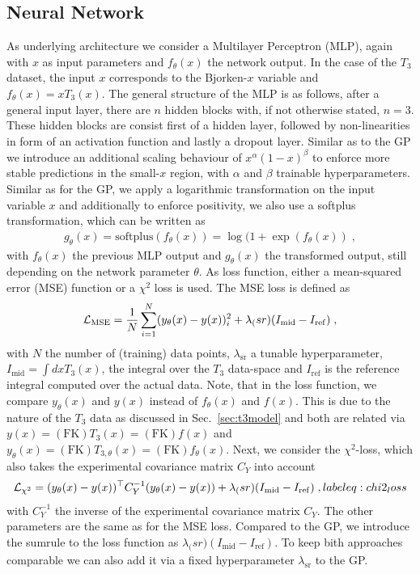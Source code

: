 \documentclass[11pt,a4paper]{article}
\begin{document}
\subsection{Neural Network}
\label{sec:NN}
%
As underlying architecture we consider a Multilayer Perceptron (MLP), again with $x$ as input parameters and $f_\theta(x)$ the network output. In the case of the $T_3$ dataset, the input $x$ corresponds to the Bjorken-$x$ variable and $f_\theta(x)=xT_3(x)$. The general structure of the MLP is as follows, after a general input layer, there are $n$ hidden blocks with, if not otherwise stated, $n=3$. These hidden blocks are consist first of a hidden layer, followed by non-linearities in form of an activation function and lastly a dropout layer.
Similar as to the GP we introduce an additional scaling behaviour of $x^\alpha (1-x)^\beta$ to enforce more stable predictions in the small-$x$ region, with $\alpha$ and $\beta$ trainable hyperparameters. Similar as for the GP, we apply a logarithmic transformation on the input variable $x$ and additionally to enforce positivity, we also use a softplus transformation, which can be written as
%
\begin{align}
    g_\theta(x) = \mathrm{softplus}(f_\theta(x)) = \log(1+\exp(f_\theta(x)) \; ,
    \label{eq:softplus}
\end{align}
%
with $f_\theta(x)$ the previous MLP output and $g_\theta(x)$ the transformed output, still depending on the network parameter $\theta$.
As loss function, either a mean-squared error (MSE) function or a $\chi^2$ loss is used.
The MSE loss is defined as
%
\begin{align}
\mathcal{L}_\mathrm{MSE} = \frac{1}{N}\sum_{i=1}^N(y_\theta(x) - y(x))_i^2+\lambda_\mathrm(sr)(I_\mathrm{mid} - I_\mathrm{ref}) \; ,
    \label{eq:MSE_loss}
\end{align}
%
with $N$ the number of (training) data points, $\lambda_\mathrm{sr}$ a tunable hyperparameter, $I_\mathrm{mid}=\int dx T_3(x)$, the integral over the $T_3$ data-space and $I_\mathrm{ref}$ is the reference integral computed over the actual data. Note, that in the loss function, we compare $y_\theta(x)$ and $y(x)$ instead of $f_\theta(x)$ and $f(x)$. This is due to the nature of the $T_3$ data as discussed in Sec.~\ref{sec:t3model} and both are related via $y(x)=\mathrm{(FK)}T_3(x)=\mathrm{(FK)} f(x)$ and $y_\theta(x)=\mathrm{(FK)}T_{3, \theta}(x)=\mathrm{(FK)} f_\theta(x)$.
Next, we consider the $\chi^2$-loss, which also takes the experimental covariance matrix $C_Y$ into account
%
\begin{align}
    \mathcal{L}_{\chi^2} = (y_\theta(x) - y(x))^\top C_Y^{-1} (y_\theta(x) - y(x)) + \lambda_\mathrm(sr)(I_\mathrm{mid} - I_\mathrm{ref}) \; ,
    label{eq:chi2_loss}
\end{align}
%
with $C_Y^{-1}$ the inverse of the experimental covariance matrix $C_Y$. The other parameters are the same as for the MSE loss. 
Compared to the GP, we introduce the sumrule to the loss function as $\lambda_\mathrm(sr)(I_\mathrm{mid} - I_\mathrm{ref})$. To keep bith approaches comparable we can also add it via a fixed hyperparameter $\lambda_\mathrm{sr}$ to the GP. 
\end{document}

